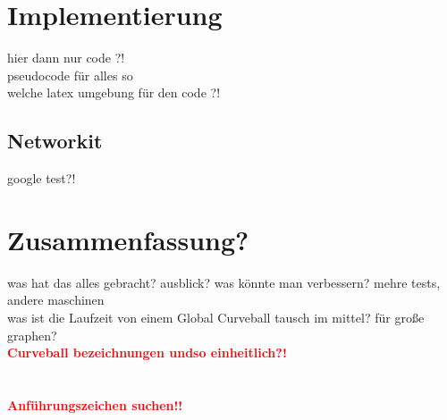 \documentclass[a4paper]{scrreprt}
\theoremstyle{plain} %
\theoremstyle{definition} %
\newcommand{\gc}{Global Curveball }
\newcommand{\cb}{Curveball }
\newcommand{\red}[1]{\textcolor{red}{\textbf{#1}}}
\begin{document}
\chapter{Implementierung}
hier dann nur code ?! 
\\
pseudocode für alles so
\\
welche latex umgebung für den code ?!
\section{Networkit}
google test?!





\chapter{Zusammenfassung?}
was hat das alles gebracht?
ausblick?
was könnte man verbessern? mehre tests, andere maschinen
\\
was ist die Laufzeit von einem \gc tausch im mittel? für große graphen?
\\
\red{\Large \cb bezeichnungen undso einheitlich?!}
\\
\\
\\
\red{\Large Anführungszeichen suchen!!}



  



\listoffigures
\end{document}
